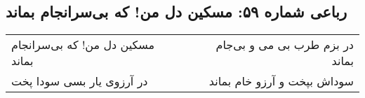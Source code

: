 \begin{center}
\section*{رباعی شماره ۵۹: مسکین دل من! که بی‌سرانجام بماند}
\label{sec:059}
\begin{longtable}{l p{0.5cm} r}
مسکین دل من! که بی‌سرانجام بماند
&&
در بزم طرب بی می و بی‌جام بماند
\\
در آرزوی یار بسی سودا پخت
&&
سوداش بپخت و آرزو خام بماند
\\
\end{longtable}
\end{center}
